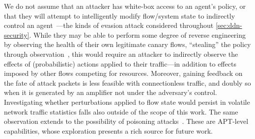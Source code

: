 We do not assume that an attacker has white-box access to an agent's policy, or that they will attempt to intelligently modify flow/system state to indirectly control an agent~\parencite{DBLP:conf/eurosp/PapernotMJFCS16, DBLP:conf/eurosp/PapernotMSW18, DBLP:journals/corr/HuangPGDA17, DBLP:conf/sp/Carlini017}---the kinds of evasion attack considered throughout \cref{sec:ddn-security}.
While they may be able to perform some degree of reverse engineering by observing the health of their own legitimate canary flows, ``stealing'' the policy through observation~\parencite{DBLP:conf/uss/TramerZJRR16}, this would require an attacker to indirectly observe the effects of (probabilistic) actions applied to their traffic---in addition to effects imposed by other flows competing for resources.
Moreover, gaining feedback on the fate of attack packets is less feasible with connectionless traffic, and doubly so when it is generated by an amplifier not under the adversary's control.
Investigating whether perturbations applied to flow state would persist in volatile network traffic statistics falls also outside of the scope of this work.
The same observation extends to the possibility of poisoning attacks~\parencite{DBLP:journals/corr/abs-1902-09062}.
These are APT-level capabilities, whose exploration presents a rich source for future work.